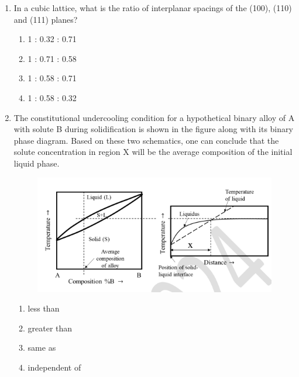 \documentclass[journal]{IEEEtran}
\theoremstyle{remark}
\begin{document}
\begin{enumerate}[resume]
\item In a cubic lattice, what is the ratio of interplanar spacings of the (100), (110) and (111) planes? \hfill{}
\begin{multicols}{2}
\begin{enumerate}
\item 1 : 0.32 : 0.71
\item 1 : 0.71 : 0.58
\item 1 : 0.58 : 0.71
\item 1 : 0.58 : 0.32
\end{enumerate}
\end{multicols}

\item The constitutional undercooling condition for a hypothetical binary alloy of A with solute B during solidification is shown in the figure along with its binary phase diagram. Based on these two schematics, one can conclude that the solute concentration in region X will be \underline{\hspace{2cm}} the average composition of the initial liquid phase. \hfill{}
\begin{figure}[H]
    \centering
    \includegraphics[width=0.6\columnwidth]{figs/Q.41.png}
    \caption{}
    \label{fig:labelholder}
\end{figure}
\begin{multicols}{2}

\begin{enumerate}
\item less than
\item greater than
\item same as
\item independent of
\end{enumerate}
\end{multicols}


\end{enumerate}
\end{document}
